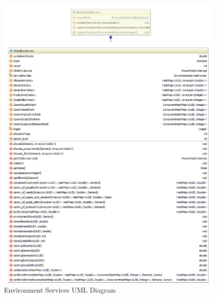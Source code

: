\begin{figure}[!h]
	\centering
	\includegraphics[scale=0.45]{Images/EnvironmentUML-1.png}
	\caption{Environment Services UML Diagram}
	\label{fig:ServiceUML}
\end{figure}


